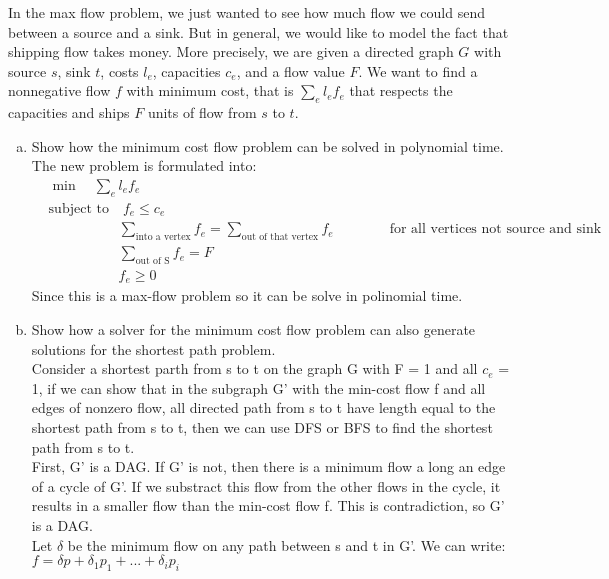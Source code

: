 \documentclass{article}\usepackage[utf8]{inputenc}\usepackage[margin=0.4cm,top=0.4cm,bottom=0.4cm]{geometry}\usepackage[usenames,dvipsnames,svgnames,table]{xcolor}
\begin{document}
\noindent In the max flow problem, we just wanted to see how much flow we could send between a source and a sink. But in general, we would like to model the fact that shipping flow takes money. More precisely, we are given a directed graph $G$ with source $s$, sink $t$, costs $l_e$, capacities $c_e$, and a flow value $F$. We want to find a nonnegative flow $f$ with minimum cost, that is $\sum_{e} l_ef_e$ that respects the capacities and ships $F$ units of flow from $s$ to $t$. 

\begin{enumerate}[(a)]
\item Show how the minimum cost flow problem can be solved in polynomial time.
\BeginSolution %
\\
The new problem is formulated into:
%
\begin{align*}
	&\min\quad \sum_{e} l_ef_e \\
	&\text{subject to}\quad f_e \leq c_e \\
	&\qquad\qquad\quad \sum_{\text{into a vertex}} f_e = \sum_{\text{out of that vertex}} f_e\qquad\qquad \text{for all vertices not source and sink}  \\
	&\qquad\qquad\quad \sum_{\text{out of S}} f_e = F  \\
	&\qquad\qquad\quad f_e \geq 0
\end{align*}
%
Since this is a max-flow problem so it can be solve in polinomial time.
\EndSolution
\item Show how a solver for the minimum cost flow problem can also generate solutions for the shortest path problem.
\BeginSolution %
\\
Consider a shortest parth from s to t on the graph G with F = 1 and all $c_e$ = 1, if we can show that in the subgraph G' with the min-cost flow f and all edges of nonzero flow, all directed path from s to t have length equal to the shortest path from s to t, then we can use DFS or BFS to find the shortest path from s to t.\\
First, G' is a DAG. If G' is not, then there is a minimum flow  a long an edge of a cycle of G'. If we substract this flow from the other flows in the cycle, it results in a smaller flow than the min-cost flow f. This is contradiction, so G' is a DAG.\\
Let $\delta$ be the minimum flow on any path between s and t in G'. We can write:\\
$f = \delta p + \delta_1 p_1+ ... + \delta_i p_i$\\

\end{enumerate}
\end{document}
